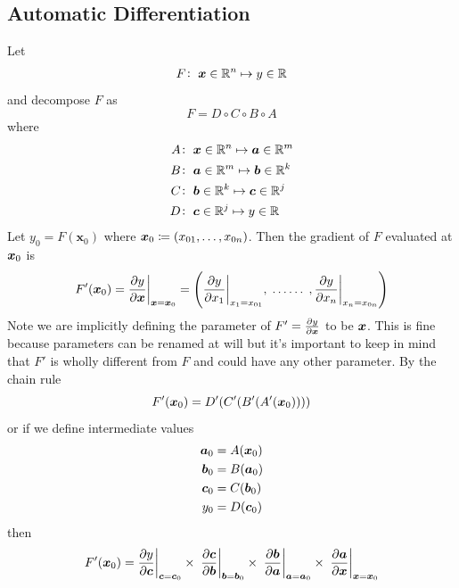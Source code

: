 \subsection{Automatic Differentiation}\label{subsubsec:autodiff}

Let
%
\begin{align*}
    F\colon\; \bm{x} \in \mathbb{R}^n \mapsto y \in \mathbb{R}
\end{align*}
%
and decompose \(F\) as
\begin{equation*}
    F = D \circ C \circ B \circ A
\end{equation*}
%
where
%
\begin{align*}
    A & \colon\; \bm{x} \in \mathbb{R}^n \mapsto  \bm{a} \in \mathbb{R}^m    \\
    B & \colon\; \bm{a} \in \mathbb{R}^m \mapsto  \bm{b} \in \mathbb{R}^k \\
    C & \colon\; \bm{b} \in \mathbb{R}^k \mapsto  \bm{c} \in \mathbb{R}^j \\
    D & \colon\; \bm{c} \in \mathbb{R}^j \mapsto  y \in \mathbb{R}
\end{align*}
%
Let \(y_0 = F(\bm{x}_0)\) where \(\bm{x}_0 \coloneqq \left( x_{01}, \dots, x_{0n}\right)\).
%
Then the gradient of \(F\) evaluated at \(\bm{x}_0\) is
\begin{equation*}
    F'(\bm{x}_0) = \evalat[\bigg]{\pdv{y}{\bm{x}}}{\bx = \bx_0}
    = \left(
    \evalat[\bigg]{\pdv{y}{x_1}}{x_1 = x_{01}},
    \;\dots\dots\;,
    \evalat[\bigg]{\pdv{y}{x_n}}{x_n = x_{0n}}
    \right)
\end{equation*}
%
Note we are implicitly defining the parameter of \(F' = \pdv{y}{\bm{x}}\) to be \(\bm{x}\).
%
This is fine because parameters can be renamed at will but it's important to keep in mind that \(F'\) is wholly different from \(F\) and could have any other parameter.
%
By the chain rule
\begin{equation*}
    F'(\bm{x}_0) =  D'(C'(B'(A'(\bm{x}_0))))
\end{equation*}
%
or if we define intermediate values
%
\begin{align*}
    \bm{a}_0 & = A(\bm{x}_0)    \\
    \bm{b}_0 & = B(\bm{a}_0) \\
    \bm{c}_0 & = C(\bm{b}_0) \\
    y_0      & = D(\bm{c}_0)
\end{align*}
%
then
%
\begin{equation}
    F'(\bm{x}_0) =  \evalat[\bigg]{\pdv{y}{\bm{c}}}{\bm{c}=\bm{c}_0} \times\;
    \evalat[\bigg]{\pdv{\bm{c}}{\bm{b}}}{\bm{b}=\bm{b}_0} \times\;
    \evalat[\bigg]{\pdv{\bm{b}}{\bm{a}}}{\bm{a}=\bm{a}_0} \times\;
    \evalat[\bigg]{\pdv{\bm{a}}{\bm{x}}}{\bx=\bx_0} \label{eqn:chainruleproduct}
\end{equation}
